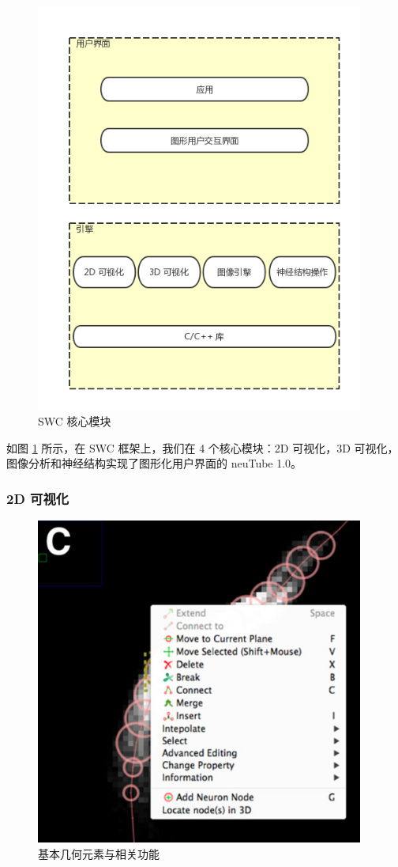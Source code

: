 {\begin{figure}
\centering
\includegraphics[width=108mm]{images/framework}
\caption{SWC 核心模块}
\label{fan2}
\end{figure}

如图 \ref{fan2} 所示，在 SWC 框架上，我们在 4 个核心模块：2D 可视化，3D 可视化， 图像分析和神经结构实现了图形化用户界面的 neuTube 1.0。

\subsubsection{2D 可视化}

\begin{figure}
\centering
\includegraphics[width=108mm]{images/3b}
\caption{基本几何元素与相关功能}
\label{fan3}
\end{figure}

}

